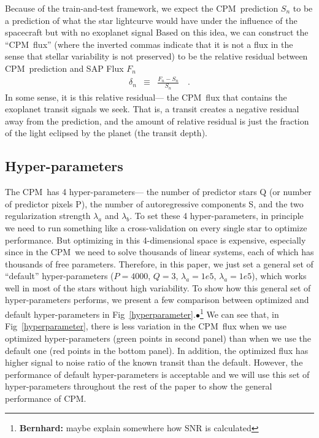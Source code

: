 \documentclass[12pt, preprint]{aastex}
\newcommand{\name}{CPM}
\newcommand{\Bernhard}[1]{$\bullet$\footnote{{\bf Bernhard:} #1}}
\begin{document}
Because of the train-and-test framework,  
  we expect the \name\ prediction $S_{n}$ to be a prediction of
  what the star lightcurve would have under the influence of the spacecraft but with no exoplanet signal 
Based on this idea, 
  we can construct the ``\name\ flux'' 
  (where the inverted commas indicate that it is not a flux in the sense that stellar variability is not preserved) 
  to be the relative residual between \name\ prediction and SAP Flux $F_{n}$
\begin{eqnarray}
\delta_{n}&\equiv&\frac{F_{n} - S_{n}}{S_{n}}
\quad .
\end{eqnarray} 
In some sense, it is this relative residual--- the \name\ flux that contains the exoplanet transit signals we seek. 
That is, a transit creates a negative residual away from the prediction, 
  and the amount of relative residual is just the fraction of the light eclipsed by the planet (the transit depth). 

\subsection{Hyper-parameters}
The \name\ has 4 hyper-parameters--- 
  the number of predictor stars Q (or number of predictor pixels P), 
  the number of autoregressive components S, 
  and the two regularization strength $\lambda_{a}$ and $\lambda_{b}$.
To set these 4 hyper-parameters, 
  in principle we need to run something like a cross-validation on every single star to optimize performance.
But optimizing in this 4-dimensional space is expensive, 
  especially since in the \name\ we need to solve thousands of linear systems, 
  each of which has thousands of free parameters. 
Therefore, in this paper, 
  we just set a general set of ``default'' hyper-parameters ($P=4000$, $Q=3$, $\lambda_a=1e5$, $\lambda_a=1e5$), 
  which works well in most of the stars without high variability. 
To show how this general set of hyper-parameters performs, 
  we present a few comparison between optimized and default hyper-parameters 
  in Fig~\ref{hyperparameter}.\Bernhard{maybe explain somewhere how SNR is calculated}  
We can see that, in Fig~\ref{hyperparameter}, 
  there is less variation in the \name\ flux 
  when we use optimized hyper-parameters (green points in second panel) 
  than when we use the default one (red points in the bottom panel). 
In addition, the optimized flux has higher signal to noise ratio of the known transit than the default. 
However, the performance of default hyper-parameters is acceptable 
  and we will use this set of hyper-parameters throughout the rest of the paper 
  to show the general performance of \name.
\end{document}
